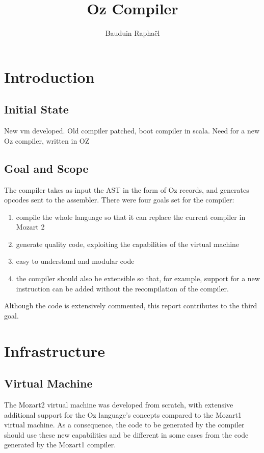 \documentclass[a4paper]{memoir}
\author{Bauduin Raphaël}
\title{Oz Compiler}
\begin{document}
\lstset{language=Oz}


\ifdraftdoc
{}
\fi

\immediate{} 

\maketitle
\tableofcontents


\chapter{Introduction}
\section{Initial State}
New vm developed.
Old compiler patched, boot compiler in scala.
Need for a new Oz compiler, written in OZ

\section{Goal and Scope}
The compiler takes as input the AST in the form of Oz records, and generates opcodes sent to the assembler. 
There were four goals set for the compiler:
\begin{enumerate}
  \item compile the whole language so that it can replace the current compiler in Mozart 2
  \item generate quality code, exploiting the capabilities of the virtual machine
  \item easy to understand and modular code
  \item the compiler should also be extensible so that, for example, support for a new instruction can be added without the recompilation of the compiler.
\end{enumerate}
Although the code is extensively commented, this report contributes to the third goal.

\chapter{Infrastructure}
\section{Virtual Machine}
The Mozart2 virtual machine was developed from scratch, with extensive additional support for the Oz language's concepts compared to the Mozart1 virtual machine. As a consequence, the code to be generated by the compiler should use these new capabilities and be different in some cases from the code generated by the Mozart1 compiler.
\end{document}
